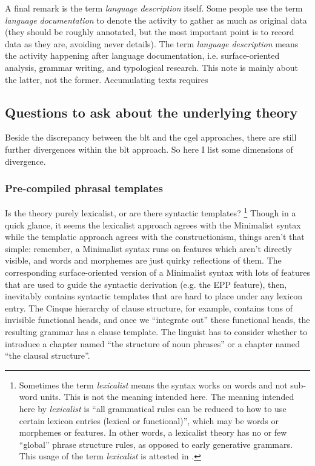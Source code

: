 \documentclass[UTF8, a4paper, oneside, scheme=plain]{ctexart}
\newcommand*{\term}[1]{\emph{#1}}
\begin{document}
A final remark is the term \term{language description} itself.
Some people use the term \term{language documentation} to denote 
the activity to gather as much as original data 
(they should be roughly annotated, 
but the most important point is to record data as they are,
avoiding never details).
The term \term{language description} means the activity happening after language documentation,
i.e. surface-oriented analysis, grammar writing, and typological research.
This note is mainly about the latter, not the former.
Accumulating texts requires 

\subsection{Questions to ask about the underlying theory}

Beside the discrepancy between the \ac{blt} and the \ac{cgel} approaches,
there are still further divergences within the \ac{blt} approach.
So here I list some dimensions of divergence.

\subsubsection{Pre-compiled phrasal templates}

Is the theory purely lexicalist, 
or are there syntactic templates?%
\footnote{
    Sometimes the term \term{lexicalist} means the syntax works on words 
    and not sub-word units.
    This is not the meaning intended here. 
    The meaning intended here by \term{lexicalist} is 
    ``all grammatical rules can be reduced to how to use certain lexicon entries (lexical or functional)'',
    which may be words or morphemes or features.
    In other words, a lexicalist theory has no or few ``global'' phrase structure rules,
    as opposed to early generative grammars.
    This usage of the term \term{lexicalist} is attested in \citet{matchin2020cortical}. 
}\label{fn:lexicalist-1}
Though in a quick glance, it seems the lexicalist approach agrees with the Minimalist syntax 
while the templatic approach agrees with the constructionism,
things aren't that simple:
remember, a Minimalist syntax runs on features which aren't directly visible,
and words and morphemes are just quirky reflections of them.
The corresponding surface-oriented version of a Minimalist syntax with lots of features 
that are used to guide the syntactic derivation (e.g. the EPP feature), then,
inevitably contains syntactic templates that are hard to place under any lexicon entry.
The Cinque hierarchy of clause structure, for example, contains tons of invisible functional heads,
and once we ``integrate out'' these functional heads,
the resulting grammar has a clause template.
The linguist has to consider whether to introduce 
a chapter named ``the structure of noun phrases''
or a chapter named ``the clausal structure''.
\end{document}
